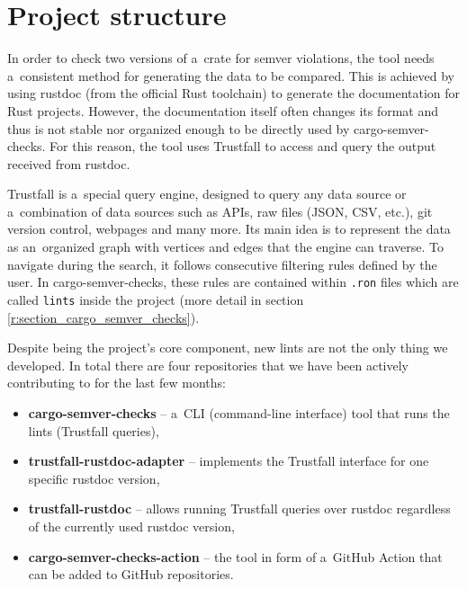 \documentclass[licencjacka,en]{pracamgr}
\begin{document}
\section{Project structure}\label{r:section_project_structure}

In order to check two versions of a~crate for semver violations, the tool needs a~consistent method
for generating the data to be compared. This is achieved by using rustdoc (from the official
Rust toolchain) to generate the documentation for Rust projects. However, the documentation itself
often changes its format and thus is not stable nor organized enough to be directly used by
cargo-semver-checks. For this reason, the tool uses Trustfall to access and query the output
received from rustdoc.

Trustfall is a~special query engine, designed to query any data source or a~combination of data
sources such as APIs, raw files (JSON, CSV, etc.), git version control, webpages and many more.
Its main idea is to represent the data as an~organized graph with vertices and edges that the
engine can traverse. To navigate during the search, it follows consecutive filtering rules defined
by the user. In cargo-semver-checks, these rules are contained within \texttt{.ron} files which
are called \texttt{lints} inside the project (more detail in section
\ref{r:section_cargo_semver_checks}).

Despite being the project's core component, new lints are not the only thing we developed. In total
there are four repositories that we have been actively contributing to for the last few months:
\begin{itemize}
	\item \textbf{cargo-semver-checks} -- a~CLI (command-line interface) tool that runs the lints
		(Trustfall queries),
	\item \textbf{trustfall-rustdoc-adapter} -- implements the Trustfall interface for one specific
		rustdoc version,
	\item \textbf{trustfall-rustdoc} -- allows running Trustfall queries over rustdoc regardless of
		the currently used rustdoc version,
	\item \textbf{cargo-semver-checks-action} -- the tool in form of a~GitHub Action that can
	    be added to GitHub repositories.
\end{itemize}
\end{document}
